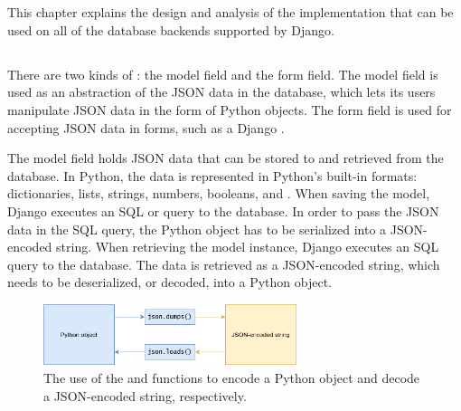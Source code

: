 \chapter{\babTiga}

This chapter explains the design and analysis of the 
implementation that can be used on all of the database backends supported by
Django.

\section{}

There are two kinds of : the model field and the form field.
The model field is used as an abstraction of the JSON data in the database,
which lets its users manipulate JSON data in the form of Python objects.
The form field is used for accepting JSON data in forms, such as a Django
.

The model field holds JSON data that can be stored to and retrieved from the
database. In Python, the data is represented in Python's built-in formats:
dictionaries, lists, strings, numbers, booleans, and . When saving
the model, Django executes an SQL  or  query to the
database. In order to pass the JSON data in the SQL query, the Python object
has to be serialized into a JSON-encoded string. When retrieving the model
instance, Django executes an SQL  query to the database. The data
is retrieved as a JSON-encoded string, which needs to be deserialized, or
decoded, into a Python object.

\begin{figure}
	\centering
    \includegraphics[width=0.66\textwidth]{pics/encodecode.png}
	\caption{The use of the  and 
	functions to encode a Python object and decode a JSON-encoded string,
	respectively.}
	\label{fig:encodecode}
\end{figure}


